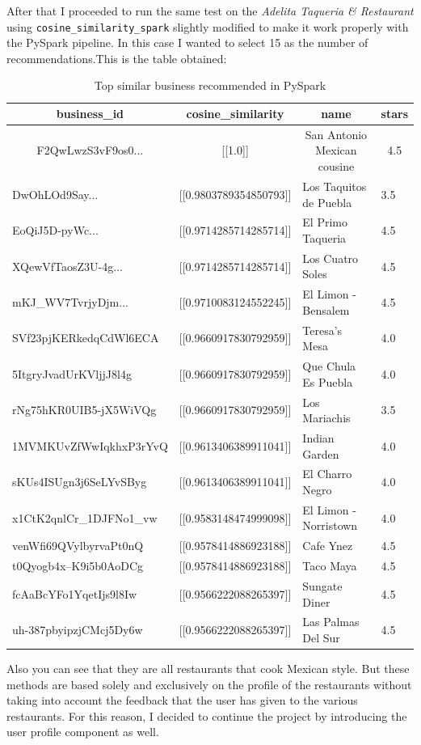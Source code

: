 \documentclass[12pt,english]{report}
\begin{document}
After that I proceeded to run the same test on the \textit{Adelita Taqueria \& Restaurant} using \texttt{cosine\_similarity\_spark} slightly modified to make it work properly with the PySpark pipeline.
In this case I wanted to select 15 as the number of recommendations.This is the table obtained:\par
\begin{table}[h]
\caption{Top similar business recommended in PySpark}
\begin{tabular}{|l|l|l|l|}
\hline
\multicolumn{1}{|c|}{business\_id}            & \multicolumn{1}{c|}{cosine\_similarity} & \multicolumn{1}{c|}{name}                        & \multicolumn{1}{c|}{stars} \\ \hline
\multicolumn{1}{|c|}{F2QwLwzS3vF9os0...} & \multicolumn{1}{c|}{{[}{[}1.0{]}{]}}    & \multicolumn{1}{c|}{San Antonio Mexican cousine} & \multicolumn{1}{c|}{4.5}   \\ \hline
DwOhLOd9Say...   & {[}{[}0.9803789354850793{]}{]} & Los Taquitos de Puebla & 3.5 \\ \hline
EoQiJ5D-pyWc...  & {[}{[}0.9714285714285714{]}{]} & El Primo Taqueria      & 4.5 \\ \hline
XQewVfTaosZ3U-4g...  & {[}{[}0.9714285714285714{]}{]} & Los Cuatro Soles       & 4.5 \\ \hline
mKJ\_WV7TvrjyDjm... & {[}{[}0.9710083124552245{]}{]} & El Limon - Bensalem    & 4.5 \\ \hline
SVf23pjKERkedqCdWl6ECA   & {[}{[}0.9660917830792959{]}{]} & Teresa's Mesa          & 4.0 \\ \hline
5ItgryJvadUrKVljjJ8l4g   & {[}{[}0.9660917830792959{]}{]} & Que Chula Es Puebla    & 4.0 \\ \hline
rNg75hKR0UIB5-jX5WiVQg   & {[}{[}0.9660917830792959{]}{]} & Los Mariachis          & 3.5 \\ \hline
1MVMKUvZfWwIqkhxP3rYvQ   & {[}{[}0.9613406389911041{]}{]} & Indian Garden          & 4.0 \\ \hline
sKUs4ISUgn3j6SeLYvSByg   & {[}{[}0.9613406389911041{]}{]} & El Charro Negro        & 4.0 \\ \hline
x1CtK2qnlCr\_1DJFNo1\_vw & {[}{[}0.9583148474999098{]}{]} & El Limon - Norristown  & 4.0 \\ \hline
venWfi69QVylbyrvaPt0nQ   & {[}{[}0.9578414886923188{]}{]} & Cafe Ynez              & 4.5 \\ \hline
t0Qyogb4x--K9i5b0AoDCg   & {[}{[}0.9578414886923188{]}{]} & Taco Maya              & 4.5 \\ \hline
fcAaBcYFo1YqetIjs9l8Iw   & {[}{[}0.9566222088265397{]}{]} & Sungate Diner          & 4.5 \\ \hline
uh-387pbyipzjCMcj5Dy6w   & {[}{[}0.9566222088265397{]}{]} & Las Palmas Del Sur     & 4.5 \\ \hline
\end{tabular}
\end{table}
Also you can see that they are all restaurants that cook Mexican style. But these methods are based solely and exclusively on the profile of the restaurants without taking into account the feedback that the user has given to the various restaurants. For this reason, I decided to continue the project by introducing the user profile component as well.
\end{document}
